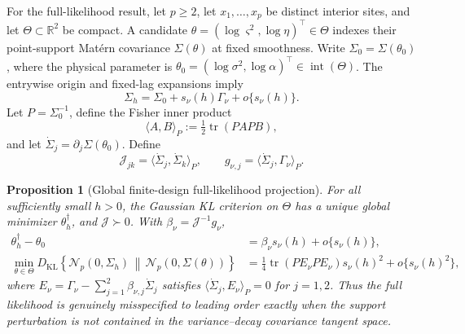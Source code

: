 \documentclass[11pt]{article}
\newtheorem{proposition}{Proposition}
\theoremstyle{remark}
\newcommand{\R}{\mathbb R}
\newcommand{\tr}{\operatorname{tr}}
\newcommand{\KL}{D_{\mathrm{KL}}}
\newcommand{\Normal}{\mathcal N}
\begin{document}
For the full-likelihood result, let \(p\geq2\), let
\(x_1,\ldots,x_p\) be distinct interior sites, and let
\(\Theta\subset\R^2\) be compact. A candidate
\(\theta=(\log\varsigma^2,\log\eta)^\top\in\Theta\) indexes their point-support
Matérn covariance \(\Sigma(\theta)\) at fixed smoothness. Write
\(\Sigma_0=\Sigma(\theta_0)\), where the physical parameter is
\(\theta_0=(\log\sigma^2,\log\alpha)^\top
\in\operatorname{int}(\Theta)\). The entrywise origin and fixed-lag
expansions imply
\begin{equation}
 \Sigma_h=\Sigma_0+s_\nu(h)\Gamma_\nu+o\{s_\nu(h)\}.
 \label{eq:finite-matrix-perturbation}
\end{equation}
Let \(P=\Sigma_0^{-1}\), define the Fisher inner product
\begin{equation}
 \langle A,B\rangle_P:=\tfrac12\tr(PAPB),
 \label{eq:finite-fisher-inner-product}
\end{equation}
and let \(\dot\Sigma_j=\partial_j\Sigma(\theta_0)\). Define
\begin{equation}
 \mathcal J_{jk}=\langle\dot\Sigma_j,\dot\Sigma_k\rangle_P,
 \qquad g_{\nu,j}=\langle\dot\Sigma_j,\Gamma_\nu\rangle_P.
 \label{eq:projection-information}
\end{equation}

\begin{proposition}[Global finite-design full-likelihood projection]
\label{prop:full-likelihood-projection}
For all sufficiently small \(h>0\), the Gaussian KL criterion on \(\Theta\)
has a unique global minimizer \(\theta_h^\dagger\), and
\(\mathcal J\succ0\). With \(\beta_\nu=\mathcal J^{-1}g_\nu\),
\begin{align}
 \theta_h^\dagger-\theta_0
 &=\beta_\nu s_\nu(h)+o\{s_\nu(h)\},
 \label{eq:finite-full-shift}\\
 \min_{\theta\in\Theta}\KL\!\left\{\Normal_p(0,\Sigma_h)\,\middle\|\,
 \Normal_p(0,\Sigma(\theta))\right\}
 &=\tfrac14\tr(PE_\nu PE_\nu)s_\nu(h)^2+o\{s_\nu(h)^2\},
 \label{eq:finite-full-kl}
\end{align}
where \(E_\nu=\Gamma_\nu-\sum_{j=1}^2\beta_{\nu,j}\dot\Sigma_j\) satisfies
\(\langle\dot\Sigma_j,E_\nu\rangle_P=0\) for \(j=1,2\). Thus the full
likelihood is genuinely misspecified to leading order exactly when the support
perturbation is not contained in the variance--decay covariance tangent space.
\end{proposition}
\end{document}
